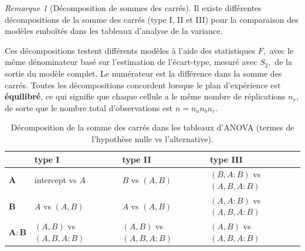 \documentclass[
  11pt,
  letterpaper,
]{scrbook}
\theoremstyle{plain}
\theoremstyle{plain}
\theoremstyle{definition}
\theoremstyle{definition}
\theoremstyle{remark}
\newtheorem{refremark}{Remarque}[chapter]
\begin{document}
\begin{refremark}[Décomposition de sommes des carrés]
Il existe différentes décompositions de la somme des carrés (type I, II
et III) pour la comparaison des modèles emboîtés dans les tableaux
d'analyse de la variance.

Ces décompositions testent différents modèles à l'aide des statistiques
\(F,\) avec le même dénominateur basé sur l'estimation de l'écart-type,
mesuré avec \(S_2,\) de la sortie du modèle complet. Le numérateur est
la différence dans la somme des carrés. Toutes les décompositions
concordent lorsque le plan d'expérience est \textbf{équilibré}, ce qui
signifie que chaque cellule a le même nombre de réplications \(n_r,\) de
sorte que le nombre total d'observations est \(n = n_an_bn_r.\)

\begin{longtable}[]{@{}
  >{\raggedright\arraybackslash}p{}
  >{\raggedright\arraybackslash}p{}
  >{\raggedright\arraybackslash}p{}
  >{\raggedright\arraybackslash}p{}@{}}

\caption{\label{tbl-ssdecompo}Décomposition de la somme des carrés dans
les tableaux d'ANOVA (termes de l'hypothèse nulle vs l'alternative).}

\tabularnewline

\toprule\noalign{}
\begin{minipage}[b]{\linewidth}\raggedright
\end{minipage} & \begin{minipage}[b]{\linewidth}\raggedright
type I
\end{minipage} & \begin{minipage}[b]{\linewidth}\raggedright
type II
\end{minipage} & \begin{minipage}[b]{\linewidth}\raggedright
type III
\end{minipage} \\
\midrule\noalign{}
\endhead
\bottomrule\noalign{}
\endlastfoot
\(\boldsymbol{A}\) & intercept vs \(A\) & \(B\) vs \((A,B)\) &
\((B, A:B)\) vs \((A,B, A:B)\) \\
\(\boldsymbol{B}\) & \(A\) vs \((A,B)\) & \(A\) vs \((A,B)\) &
\((A, A:B)\) vs \((A,B,A:B)\) \\
\(\boldsymbol{A:B}\) & \((A,B)\) vs \((A,B,A:B)\) & \((A,B)\) vs
\((A,B,A:B)\) & \((A,B)\) vs \((A,B,A:B)\) \\


\end{longtable}
\end{refremark}
\end{document}
